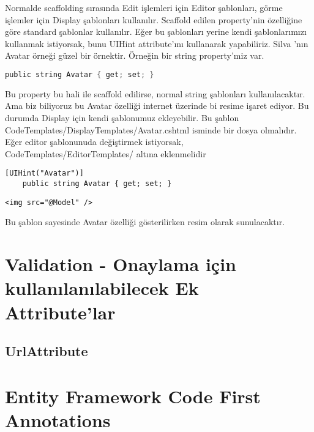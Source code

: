 \documentclass[10pt,a4paper]{article}
\begin{document}
Normalde scaffolding sırasında Edit işlemleri için Editor şablonları,
görme işlemler için Display şablonları kullanılır.
Scaffold edilen property'nin özelliğine göre standard şablonlar kullanılır.
Eğer bu şablonları yerine kendi şablonlarımızı kullanmak istiyorsak,
bunu UIHint attribute'ını kullanarak yapabiliriz.
Silva \cite{Silva2010Quick}'nın Avatar örneği güzel bir örnektir.
Örneğin bir string property'miz var.

\begin{lstlisting}[label=code-UIHintOrnek1,caption=UIHint Örnek1,language=C]
	public string Avatar { get; set; }
\end{lstlisting}

Bu property bu hali ile scaffold edilirse, normal string şablonları kullanılacaktır.
Ama biz biliyoruz bu Avatar özelliği internet üzerinde bi resime işaret ediyor.
Bu durumda Display için kendi şablonumuz ekleyebilir.
Bu şablon CodeTemplates/DisplayTemplates/Avatar.cshtml isminde bir dosya olmalıdır.
Eğer editor şablonunuda değiştirmek istiyorsak,  CodeTemplates/EditorTemplates/ altına eklenmelidir


\begin{lstlisting}[label=code-UIHintOrnek1,caption=UIHint Örnek1]
	[UIHint("Avatar")]
	public string Avatar { get; set; }
\end{lstlisting}


\begin{lstlisting}[label=code-UIHintOrnek cshtml,caption=UIHint cshtml]
	<img src="@Model" />
\end{lstlisting}

Bu şablon sayesinde Avatar özelliği gösterilirken resim olarak sunulacaktır.



\section{Validation - Onaylama için kullanılanılabilecek Ek Attribute'lar}

\subsection{UrlAttribute}




\section{Entity Framework Code First Annotations}
\end{document}
